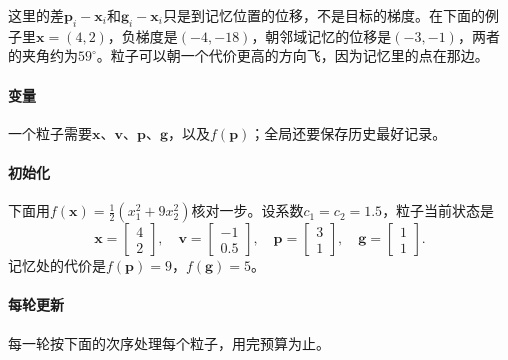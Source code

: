 这里的差$\bm{p}_i-\bm{x}_i$和$\bm{g}_i-\bm{x}_i$只是到记忆位置的位移，不是目标的梯度。在下面的例子里$\bm{x}=(4,2)$，负梯度是$(-4,-18)$，朝邻域记忆的位移是$(-3,-1)$，两者的夹角约为$59^\circ$。粒子可以朝一个代价更高的方向飞，因为记忆里的点在那边。

\paragraph{变量}
一个粒子需要$\bm{x}$、$\bm{v}$、$\bm{p}$、$\bm{g}$，以及$f(\bm{p})$；全局还要保存历史最好记录。

\paragraph{初始化}
下面用$f(\bm{x})=\tfrac12(x_1^2+9x_2^2)$核对一步。设系数$c_1=c_2=1.5$，粒子当前状态是
\[
 \bm{x}=\begin{bmatrix}4\\2\end{bmatrix},\quad\bm{v}=\begin{bmatrix}-1\\0.5\end{bmatrix},\quad\bm{p}=\begin{bmatrix}3\\1\end{bmatrix},\quad\bm{g}=\begin{bmatrix}1\\1\end{bmatrix}.
\]
记忆处的代价是$f(\bm{p})=9$，$f(\bm{g})=5$。

\paragraph{每轮更新}
每一轮按下面的次序处理每个粒子，用完预算为止。

